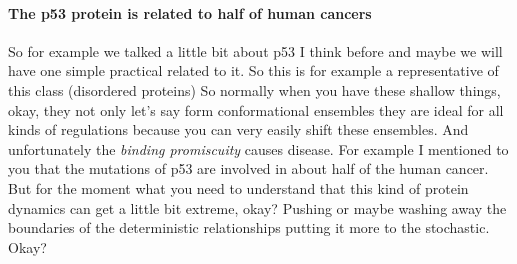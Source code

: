\paragraph{The p53 protein is related to half of human cancers}
So for example we talked a little bit about p53 I think before and maybe we will have one simple practical related to it. So this is for example a representative of this class (disordered proteins)
So normally when you have these shallow things, okay, they not only let’s say form conformational ensembles they are ideal for all kinds of regulations because you can very easily shift these ensembles. And unfortunately the \textit{binding promiscuity} causes disease. For example I mentioned to you that the mutations of p53 are involved in about half of the human cancer. But for the moment what you need to understand that this kind of protein dynamics can get a little bit extreme, okay? Pushing or maybe washing away the boundaries of the deterministic relationships putting it more to the stochastic. Okay?
